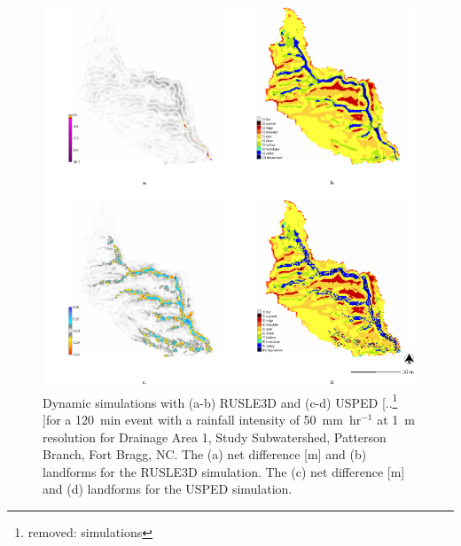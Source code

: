 \documentclass[gmd, manuscript]{copernicus}
\providecommand{\DIFadd}[1]{{\protect\color{blue} \sf #1}} %
\providecommand{\DIFdel}[1]{{\protect\color{red} [..\footnote{removed: #1} ]}} %
\providecommand{\DIFaddFL}[1]{\DIFadd{#1}} %
\providecommand{\DIFdelFL}[1]{\DIFdel{#1}} %
\providecommand{\DIFaddbeginFL}{} %
\providecommand{\DIFaddendFL}{} %
\providecommand{\DIFdelbeginFL}{} %
\providecommand{\DIFdelendFL}{} %
\begin{document}
\begin{figure}
\center
\includegraphics[width=\textwidth,height=0.925\textheight,keepaspectratio]{figures/simulations.pdf}
\caption{Dynamic \DIFaddbeginFL \DIFaddFL{simulations with (a-b) }\DIFaddendFL RUSLE3D and \DIFaddbeginFL \DIFaddFL{(c-d) }\DIFaddendFL USPED
\DIFdelbeginFL \DIFdelFL{simulations
}\DIFdelendFL for a 120~\unit{min} event with a rainfall intensity of 50~\unit{mm~hr}$^{-1}$
\DIFaddbeginFL \DIFaddFL{at 1~}\unit{m} \DIFaddFL{resolution for
Drainage Area 1, Study Subwatershed, Patterson Branch, Fort Bragg, NC.
The (a) net difference }[\unit{m}] \DIFaddFL{and 
(b) landforms for the RUSLE3D simulation.
The (c) net difference }[\unit{m}] \DIFaddFL{and 
(d) landforms for the USPED simulation.
}\DIFaddendFL }
\label{fig:simulations}
\end{figure}
\end{document}

